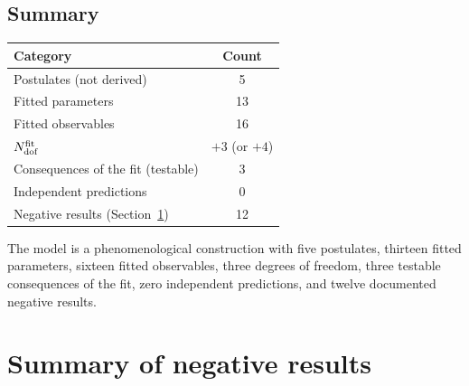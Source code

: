 \documentclass[12pt,a4paper]{article}
\numberwithin{equation}{section}
\begin{document}
\subsection{Summary}
\begin{table}[H]
\centering
\begin{tabular}{lc}
\toprule
Category & Count \\
\midrule
Postulates (not derived) & 5 \\
Fitted parameters & 13 \\
Fitted observables & 16 \\
\(N_{\rm dof}^{\rm fit}\) & \(+3\) (or \(+4\)) \\
Consequences of the fit (testable) & 3 \\
Independent predictions & 0 \\
Negative results (Section~\ref{sec:negative_summary}) & 12 \\
\bottomrule
\end{tabular}
\end{table}

\noindent The model is a phenomenological construction with five
postulates, thirteen fitted parameters, sixteen fitted observables,
three degrees of freedom, three testable consequences of the fit, zero
independent predictions, and twelve documented negative results.

\section{Summary of negative results}
\label{sec:negative_summary}
\end{document}
